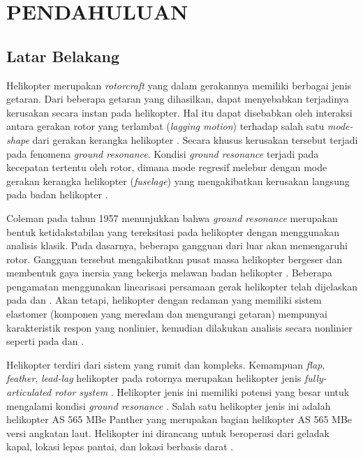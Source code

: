 \chapter{PENDAHULUAN}
\label{chap:pendahuluan}

\section{Latar Belakang}
\label{sec:latarbelakang}

Helikopter merupakan \textit{rotorcraft} yang dalam gerakannya memiliki berbagai jenis getaran. Dari beberapa getaran yang dihasilkan, dapat menyebabkan terjadinya kerusakan secara instan pada helikopter. Hal itu dapat disebabkan oleh interaksi antara gerakan rotor yang terlambat (\textit{lagging motion}) terhadap salah satu \textit{mode-shape} dari gerakan kerangka helikopter \cite{Dzy1}. Secara khusus kerusakan tersebut terjadi pada fenomena \textit{ground resonance}.  Kondisi \textit{ground resonance} terjadi pada kecepatan tertentu oleh rotor, dimana mode regresif melebur dengan mode gerakan kerangka helikopter (\textit{fuselage}) yang mengakibatkan kerusakan langsung pada badan helikopter \cite{DASIL}. 

Coleman pada tahun 1957 menunjukkan bahwa \textit{ground resonance} merupakan bentuk ketidakstabilan yang tereksitasi pada helikopter dengan menggunakan analisis klasik. Pada dasarnya, beberapa gangguan dari luar akan memengaruhi rotor. Gangguan tersebut mengakibatkan pusat massa helikopter bergeser dan membentuk gaya inersia yang bekerja melawan badan helikopter \cite{Coleman}. Beberapa pengamatan menggunakan linearisasi persamaan gerak helikopter telah dijelaskan pada \cite{Friedmann} dan \cite{bielawa2006}. Akan tetapi, helikopter dengan redaman yang memiliki sistem elastomer (komponen yang meredam dan mengurangi getaran) mempunyai karakteristik respon yang nonlinier, kemudian dilakukan analisis secara nonlinier seperti pada \cite{KUNZ2002383} dan \cite{DASIL}. 

Helikopter terdiri dari sistem yang rumit dan kompleks. Kemampuan \textit{flap}, \textit{feather}, \textit{lead-lag} helikopter pada rotornya merupakan helikopter jenis \textit{fully-articulated rotor system} \cite{wagtendonk2006principles}. Helikopter jenis ini memiliki potensi yang besar untuk mengalami kondisi \textit{ground resonance} \cite{Eckert2007AnalyticalAA}. Salah satu helikopter jenis ini adalah helikopter AS 565 MBe Panther yang merupakan bagian helikopter AS 565 MBe versi angkatan laut. Helikopter ini dirancang untuk beroperasi dari geladak kapal, lokasi lepas pantai, dan lokasi berbasis darat \cite{AS565MBe}.

